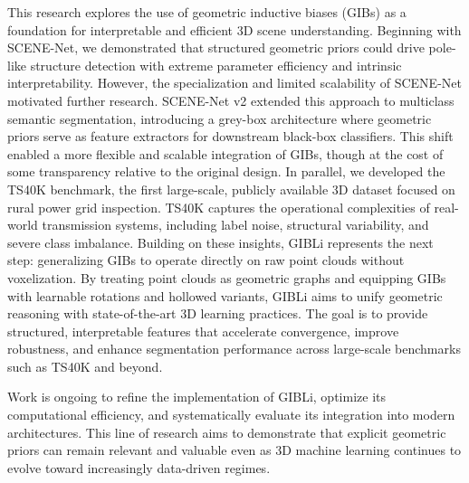 This research explores the use of geometric inductive biases (GIBs) as a
foundation for interpretable and efficient 3D scene understanding. Beginning
with SCENE-Net, we demonstrated that structured geometric priors could drive
pole-like structure detection with extreme parameter efficiency and intrinsic
interpretability. However, the specialization and limited scalability of
SCENE-Net motivated further research.
%
SCENE-Net v2 extended this approach to multiclass semantic segmentation,
introducing a grey-box architecture where geometric priors serve as feature
extractors for downstream black-box classifiers. This shift enabled a more
flexible and scalable integration of GIBs, though at the cost of some
transparency relative to the original design.
%
In parallel, we developed the TS40K benchmark, the first large-scale, publicly
available 3D dataset focused on rural power grid inspection. TS40K captures the
operational complexities of real-world transmission systems, including label
noise, structural variability, and severe class imbalance.
%
Building on these insights, GIBLi represents the next step: generalizing GIBs
to operate directly on raw point clouds without voxelization. By treating point
clouds as geometric graphs and equipping GIBs with learnable rotations and
hollowed variants, GIBLi aims to unify geometric reasoning with
state-of-the-art 3D learning practices. The goal is to provide structured,
interpretable features that accelerate convergence, improve robustness, and
enhance segmentation performance across large-scale benchmarks such as TS40K
and beyond.

Work is ongoing to refine the implementation of GIBLi, optimize its
computational efficiency, and systematically evaluate its integration into
modern architectures. This line of research aims to demonstrate that explicit
geometric priors can remain relevant and valuable even as 3D machine learning
continues to evolve toward increasingly data-driven regimes.